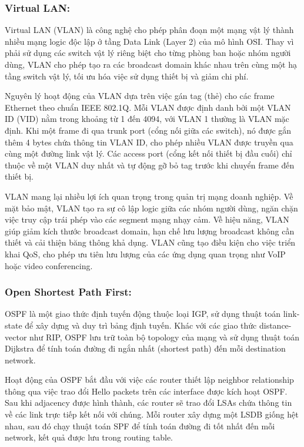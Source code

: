 \subsubsection{Virtual LAN:}
    Virtual LAN (VLAN) là công nghệ cho phép phân đoạn một mạng vật lý thành nhiều mạng logic độc lập ở tầng Data Link (Layer 2) của mô hình OSI. Thay vì phải sử dụng các switch vật lý riêng biệt cho từng phòng ban hoặc nhóm người dùng, VLAN cho phép tạo ra các broadcast domain khác nhau trên cùng một hạ tầng switch vật lý, tối ưu hóa việc sử dụng thiết bị và giảm chi phí.
    
    Nguyên lý hoạt động của VLAN dựa trên việc gán tag (thẻ) cho các frame Ethernet theo chuẩn IEEE 802.1Q. Mỗi VLAN được định danh bởi một VLAN ID (VID) nằm trong khoảng từ 1 đến 4094, với VLAN 1 thường là VLAN mặc định. Khi một frame đi qua trunk port (cổng nối giữa các switch), nó được gắn thêm 4 bytes chứa thông tin VLAN ID, cho phép nhiều VLAN được truyền qua cùng một đường link vật lý. Các access port (cổng kết nối thiết bị đầu cuối) chỉ thuộc về một VLAN duy nhất và tự động gỡ bỏ tag trước khi chuyển frame đến thiết bị.
    
    VLAN mang lại nhiều lợi ích quan trọng trong quản trị mạng doanh nghiệp. Về mặt bảo mật, VLAN tạo ra sự cô lập logic giữa các nhóm người dùng, ngăn chặn việc truy cập trái phép vào các segment mạng nhạy cảm. Về hiệu năng, VLAN giúp giảm kích thước broadcast domain, hạn chế lưu lượng broadcast không cần thiết và cải thiện băng thông khả dụng. VLAN cũng tạo điều kiện cho việc triển khai QoS, cho phép ưu tiên lưu lượng của các ứng dụng quan trọng như VoIP hoặc video conferencing.
\subsubsection{Open Shortest Path First:}
    OSPF là một giao thức định tuyến động thuộc loại IGP, sử dụng thuật toán link-state để xây dựng và duy trì bảng định tuyến\cite{GeeksforGeeks-OSPF}\cite{Cloudflare-OSPF}. Khác với các giao thức distance-vector như RIP, OSPF lưu trữ toàn bộ topology của mạng và sử dụng thuật toán Dijkstra để tính toán đường đi ngắn nhất (shortest path) đến mỗi destination network.
    
    Hoạt động của OSPF bắt đầu với việc các router thiết lập neighbor relationship thông qua việc trao đổi Hello packets trên các interface được kích hoạt OSPF. Sau khi adjacency được hình thành, các router sẽ trao đổi LSAs chứa thông tin về các link trực tiếp kết nối với chúng\cite{Cisco-OSPF-7039-1}. Mỗi router xây dựng một LSDB giống hệt nhau, sau đó chạy thuật toán SPF để tính toán đường đi tốt nhất đến mỗi network, kết quả được lưu trong routing table.
    
